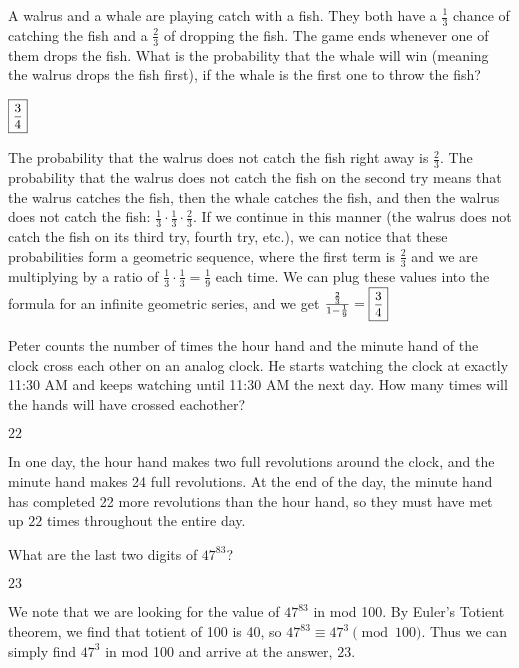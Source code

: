 \documentclass[11pt]{article}
\begin{document}
\begin{problem}
A walrus and a whale are playing catch with a fish. They both have a $\frac{1}{3}$ chance of catching the fish and a $\frac{2}{3}$ of dropping the fish. The game ends whenever one of them drops the fish. What is the probability that the whale will win (meaning the walrus drops the fish first), if the whale is the first one to throw the fish?
\end{problem}
\begin{answer}
$\small\boxed{\frac{3}{4}\normalsize}$
\end{answer}
\begin{solution}
The probability that the walrus does not catch the fish right away is $\frac{2}{3}$. The probability that the walrus does not catch the fish on the second try means that the walrus catches the fish, then the whale catches the fish, and then the walrus does not catch the fish: $\frac{1}{3}\cdot\frac{1}{3}\cdot\frac{2}{3}$. If we continue in this manner (the walrus does not catch the fish on its third try, fourth try, etc.), we can notice that these probabilities form a geometric sequence, where the first term is $\frac{2}{3}$ and we are multiplying by a ratio of $\frac{1}{3}\cdot\frac{1}{3} = \frac{1}{9}$ each time. We can plug these values into the formula for an infinite geometric series, and we get $\frac{\frac{2}{3}}{1 - \frac{1}{9}} = \small\boxed{\frac{3}{4}\normalsize}$
\end{solution}

\begin{problem}
Peter counts the number of times the hour hand and the minute hand of the clock cross each other on an analog clock. He starts watching the clock at exactly 11:30 AM and keeps watching until 11:30 AM the next day. How many times will the hands will have crossed eachother?
\end{problem}
\begin{answer}
$\boxed{22}$
\end{answer}
\begin{solution}
In one day, the hour hand makes two full revolutions around the clock, and the minute hand makes 24 full revolutions. At the end of the day, the minute hand has completed 22 more revolutions than the hour hand, so they must have met up $\boxed{22}$ times throughout the entire day.
\end{solution}

\begin{problem}
What are the last two digits of $47^{83}$?
\end{problem}
\begin{answer}
$\boxed{23}$
\end{answer}
\begin{solution}
We note that we are looking for the value of $47^{83}$ in mod 100. By Euler's Totient theorem, we find that totient of 100 is 40, so $47^{83} \equiv 47^3 \pmod{100}$. Thus we can simply find $47^3$ in mod 100 and arrive at the answer, $\boxed{23}$.
\end{solution}
\end{document}
